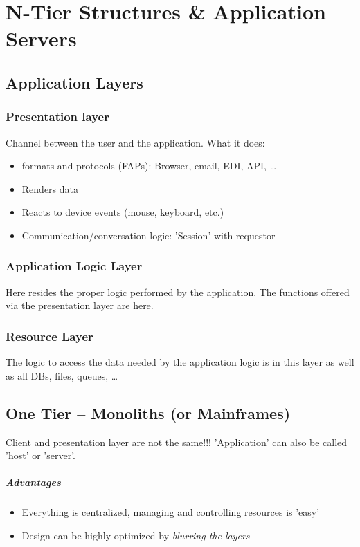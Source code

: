 \chapter{N-Tier Structures \& Application Servers}
	\section{Application Layers}
		\subsection{Presentation layer}
			Channel between the user and the application. What it does:
			\begin{itemize}
				\item formats and protocols (FAPs): Browser, email, EDI, API, \ldots
				\item Renders data
				\item Reacts to device events (mouse, keyboard, etc.)
				\item Communication/conversation logic: 'Session' with requestor
			\end{itemize}
		
		\subsection{Application Logic Layer}
			Here resides the proper logic performed by the application. The functions offered via the presentation layer are here.
			
		\subsection{Resource Layer}
			The logic to access the data needed by the application logic is in this layer as well as all DBs, files, queues, \ldots \\
		
		
		
	\section{One Tier -- Monoliths (or Mainframes)}
		Client and presentation layer are not the same!!! 'Application' can also be called 'host' or 'server'.
		\paragraph{Advantages}
			\begin{itemize}
				\item Everything is centralized, managing and controlling resources is 'easy'
				\item Design can be highly optimized by	\textit{blurring the layers}
			\end{itemize}
